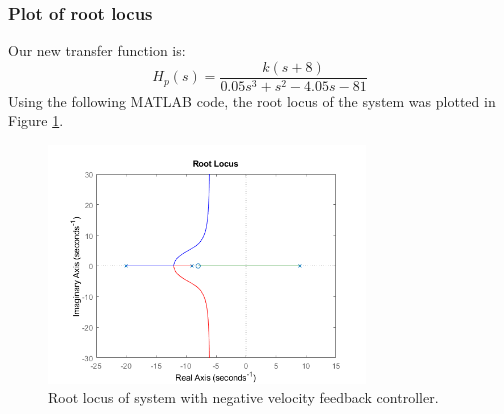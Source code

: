 \documentclass[11pt]{article}
\numberwithin{equation}{section}
\begin{document}
\subsubsection{Plot of root locus}
Our new transfer function is:
\begin{equation}
    H_p(s) = \frac{k\left(s+8\right)}{0.05s^3 + s^2 -4.05s - 81}
\end{equation}
Using the following MATLAB code, the root locus of the system was plotted in Figure \ref{q3ci}.

\begin{figure}[H]
    \centering
    \includegraphics[width = 0.75\textwidth]{./img/q3ci.png}
    \caption{Root locus of system with negative velocity feedback controller.}
    \label{q3ci}
\end{figure}
\end{document}
